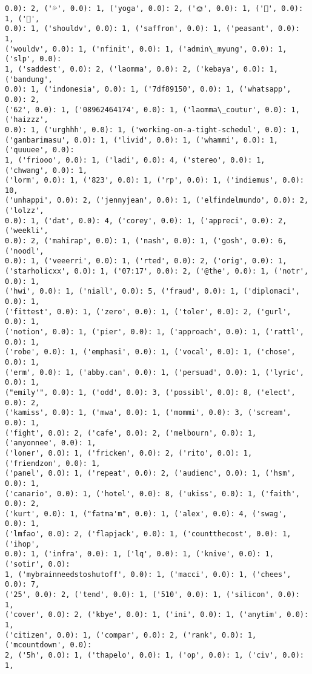 \documentclass[11pt]{article}
\begin{document}
\begin{Verbatim}[commandchars=\\\{\}]
0.0): 2, ('💦', 0.0): 1, ('yoga', 0.0): 2, ('🌞', 0.0): 1, ('💃', 0.0): 1, ('🏽',
0.0): 1, ('shouldv', 0.0): 1, ('saffron', 0.0): 1, ('peasant', 0.0): 1,
('wouldv', 0.0): 1, ('nfinit', 0.0): 1, ('admin\_myung', 0.0): 1, ('slp', 0.0):
1, ('saddest', 0.0): 2, ('laomma', 0.0): 2, ('kebaya', 0.0): 1, ('bandung',
0.0): 1, ('indonesia', 0.0): 1, ('7df89150', 0.0): 1, ('whatsapp', 0.0): 2,
('62', 0.0): 1, ('08962464174', 0.0): 1, ('laomma\_coutur', 0.0): 1, ('haizzz',
0.0): 1, ('urghhh', 0.0): 1, ('working-on-a-tight-schedul', 0.0): 1,
('ganbarimasu', 0.0): 1, ('livid', 0.0): 1, ('whammi', 0.0): 1, ('quuuee', 0.0):
1, ('friooo', 0.0): 1, ('ladi', 0.0): 4, ('stereo', 0.0): 1, ('chwang', 0.0): 1,
('lorm', 0.0): 1, ('823', 0.0): 1, ('rp', 0.0): 1, ('indiemus', 0.0): 10,
('unhappi', 0.0): 2, ('jennyjean', 0.0): 1, ('elfindelmundo', 0.0): 2, ('lolzz',
0.0): 1, ('dat', 0.0): 4, ('corey', 0.0): 1, ('appreci', 0.0): 2, ('weekli',
0.0): 2, ('mahirap', 0.0): 1, ('nash', 0.0): 1, ('gosh', 0.0): 6, ('noodl',
0.0): 1, ('veeerri', 0.0): 1, ('rted', 0.0): 2, ('orig', 0.0): 1,
('starholicxx', 0.0): 1, ('07:17', 0.0): 2, ('@the', 0.0): 1, ('notr', 0.0): 1,
('hwi', 0.0): 1, ('niall', 0.0): 5, ('fraud', 0.0): 1, ('diplomaci', 0.0): 1,
('fittest', 0.0): 1, ('zero', 0.0): 1, ('toler', 0.0): 2, ('gurl', 0.0): 1,
('notion', 0.0): 1, ('pier', 0.0): 1, ('approach', 0.0): 1, ('rattl', 0.0): 1,
('robe', 0.0): 1, ('emphasi', 0.0): 1, ('vocal', 0.0): 1, ('chose', 0.0): 1,
('erm', 0.0): 1, ('abby.can', 0.0): 1, ('persuad', 0.0): 1, ('lyric', 0.0): 1,
("emily'", 0.0): 1, ('odd', 0.0): 3, ('possibl', 0.0): 8, ('elect', 0.0): 2,
('kamiss', 0.0): 1, ('mwa', 0.0): 1, ('mommi', 0.0): 3, ('scream', 0.0): 1,
('fight', 0.0): 2, ('cafe', 0.0): 2, ('melbourn', 0.0): 1, ('anyonnee', 0.0): 1,
('loner', 0.0): 1, ('fricken', 0.0): 2, ('rito', 0.0): 1, ('friendzon', 0.0): 1,
('panel', 0.0): 1, ('repeat', 0.0): 2, ('audienc', 0.0): 1, ('hsm', 0.0): 1,
('canario', 0.0): 1, ('hotel', 0.0): 8, ('ukiss', 0.0): 1, ('faith', 0.0): 2,
('kurt', 0.0): 1, ("fatma'm", 0.0): 1, ('alex', 0.0): 4, ('swag', 0.0): 1,
('lmfao', 0.0): 2, ('flapjack', 0.0): 1, ('countthecost', 0.0): 1, ('ihop',
0.0): 1, ('infra', 0.0): 1, ('lq', 0.0): 1, ('knive', 0.0): 1, ('sotir', 0.0):
1, ('mybrainneedstoshutoff', 0.0): 1, ('macci', 0.0): 1, ('chees', 0.0): 7,
('25', 0.0): 2, ('tend', 0.0): 1, ('510', 0.0): 1, ('silicon', 0.0): 1,
('cover', 0.0): 2, ('kbye', 0.0): 1, ('ini', 0.0): 1, ('anytim', 0.0): 1,
('citizen', 0.0): 1, ('compar', 0.0): 2, ('rank', 0.0): 1, ('mcountdown', 0.0):
2, ('5h', 0.0): 1, ('thapelo', 0.0): 1, ('op', 0.0): 1, ('civ', 0.0): 1,

\end{Verbatim}
\end{document}
